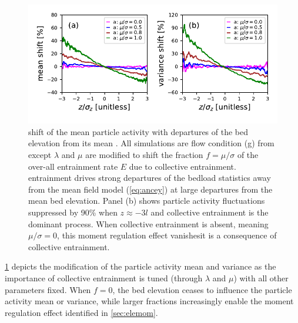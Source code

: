 \begin{figure}[!htbp]
	\includegraphics[width=\linewidth,keepaspectratio]{./figures/ch3/colent-suppression.pdf}
	\caption{\DIFdelbeginFL {}\DIFdelendFL \DIFaddbeginFL {}\DIFaddendFL shift of the mean particle activity \DIFdelbeginFL {}\DIFdelendFL with departures of the bed elevation from its mean \DIFaddbeginFL {}\DIFaddendFL . All simulations are \DIFdelbeginFL {}\DIFdelendFL \DIFaddbeginFL {}\DIFaddendFL flow condition (g) from \DIFdelbeginFL {}\DIFdelendFL \DIFaddbeginFL {}\DIFaddendFL except \DIFaddbeginFL {}\DIFaddendFL $\lambda$ and $\mu$ are modified to shift the fraction $f=\mu/\sigma$ of the over-all entrainment rate $E$ due to collective entrainment. \DIFdelbeginFL {}\DIFdelendFL \DIFaddbeginFL {}\DIFaddendFL entrainment drives strong departures of the bedload statistics away from the mean field model (\DIFaddbeginFL {}\DIFaddendFL \ref{eq:ancey}) at large departures from the mean bed elevation. Panel (b) shows particle activity fluctuations suppressed by 90\% when $z\approx -3l$ and collective entrainment is the dominant process. When collective entrainment is absent, meaning $\mu/\sigma=0$, this moment regulation effect vanishes\DIFdelbeginFL \DIFdelFL{: }\DIFdelendFL \DIFaddbeginFL {}\DIFaddendFL it is a consequence of collective entrainment.}
	\label{fig:colent}
\end{figure}
\DIFdelbegin {}\DIFdelend \DIFaddbegin {}\DIFaddend \ref{fig:colent} depicts the modification of the particle activity mean and variance as the importance of collective entrainment is tuned (through $\lambda$ and $\mu$) with all other parameters fixed. When $f=0$, the bed elevation ceases to influence the particle activity mean or variance, while larger fractions increasingly enable the moment regulation effect identified in \DIFdelbegin {}\DIFdelend \DIFaddbegin {}\DIFaddend \ref{sec:elemom}.

